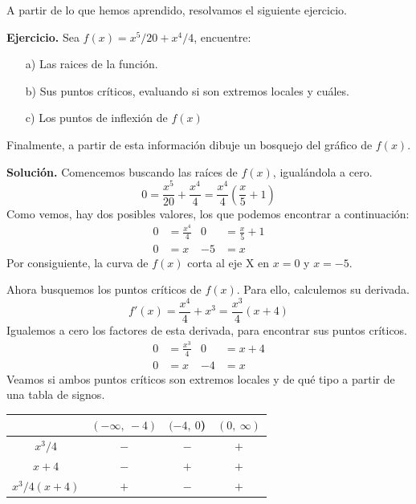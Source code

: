\documentclass[12pt]{article}
\begin{document}
A partir de lo que hemos aprendido, resolvamos el siguiente ejercicio.

\textbf{Ejercicio.} \quad Sea $f(x) = x^{5}/20 + x^{4}/4$, encuentre:

\begin{itemize}
\item[a)] Las raices de la función.
\item[b)] Sus puntos críticos, evaluando si son extremos locales y cuáles.
\item[c)] Los puntos de inflexión de $f(x)$
\end{itemize}

Finalmente, a partir de esta información dibuje un bosquejo del gráfico de $f(x)$.

\textbf{Solución.} \quad Comencemos buscando las raíces de $f(x)$, igualándola a cero.
\[
0 = \frac{x^{5}}{20} + \frac{x^{4}}{4} =
	\frac{x^{4}}{4} \left(\frac{x}{5} + 1\right)
\]
Como vemos, hay dos posibles valores, los que podemos encontrar a continuación:
\begin{align*}
0 &= \frac{x^{4}}{4} & 0 &= \frac{x}{5} + 1 \\
0 &= x & -5 &= x
\end{align*}
Por consiguiente, la curva de $f(x)$ corta al eje X en $x = 0$ y $x = -5$.

Ahora busquemos los puntos críticos de $f(x)$. Para ello, calculemos su derivada.
\[
f'(x) = \frac{x^{4}}{4} + x^{3} = \frac{x^{3}}{4} (x + 4)
\]
Igualemos a cero los factores de esta derivada, para encontrar sus puntos críticos.
\begin{align*}
0 &= \frac{x^{3}}{4} & 0 &= x + 4 \\
0 &= x & -4 &= x
\end{align*}
Veamos si ambos puntos críticos son extremos locales y de qué tipo a partir de una tabla de signos.

\begin{table}[hbt!]
\centering

{\renewcommand{\arraystretch}{1.3}
\begin{tabular}{c c c c}
 & $(-\infty, \ -4)$ & $(-4, \ 0$) & $(0, \ \infty)$ \\
\hline
$x^{3}/4$ & $-$ & $-$ & $+$ \\
$x + 4$ & $-$ & $+$ & $+$ \\
\hline
$x^{3}/4 (x + 4)$ & $+$ & $-$ & $+$ \\
\end{tabular}
}

\end{table}
\end{document}

